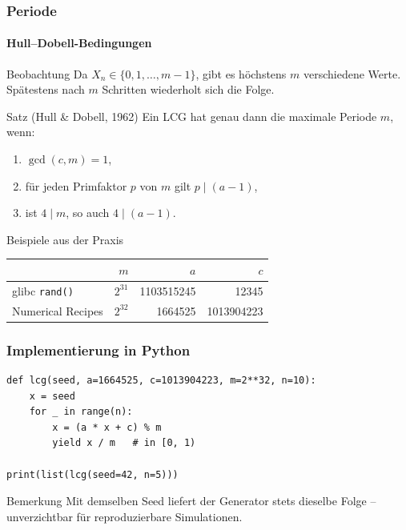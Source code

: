 \documentclass{beamer}
\begin{document}
\begin{frame}
    \frametitle{Periode}
    \framesubtitle{Hull--Dobell-Bedingungen}

\begin{block}{Beobachtung}
Da $X_n \in \{0, 1, \ldots, m-1\}$, gibt es höchstens $m$ verschiedene
Werte. Spätestens nach $m$ Schritten wiederholt sich die Folge.
\end{block}

\begin{block}{Satz (Hull \& Dobell, 1962)}
Ein LCG hat genau dann die maximale Periode $m$, wenn:
\begin{enumerate}
    \item $\gcd(c, m) = 1$,
    \item für jeden Primfaktor $p$ von $m$ gilt $p \mid (a-1)$,
    \item ist $4 \mid m$, so auch $4 \mid (a-1)$.
\end{enumerate}
\end{block}

\begin{block}{Beispiele aus der Praxis}
\begin{tabular}{lrrr}
\toprule
                    & $m$       & $a$         & $c$ \\
\midrule
glibc \texttt{rand()}        & $2^{31}$  & 1103515245  & 12345 \\
Numerical Recipes   & $2^{32}$  & 1664525     & 1013904223 \\
\bottomrule
\end{tabular}
\end{block}

\end{frame}


\begin{frame}[fragile]
    \frametitle{Implementierung in Python}

\begin{lstlisting}
def lcg(seed, a=1664525, c=1013904223, m=2**32, n=10):
    x = seed
    for _ in range(n):
        x = (a * x + c) % m
        yield x / m   # in [0, 1)

print(list(lcg(seed=42, n=5)))
\end{lstlisting}

\begin{block}{Bemerkung}
Mit demselben Seed liefert der Generator stets dieselbe Folge --
unverzichtbar für reproduzierbare Simulationen.
\end{block}

\end{frame}
\end{document}
